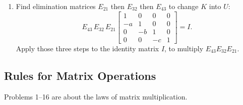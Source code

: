 \documentclass[14pt, a4paper]{article}
\begin{document}
\begin{enumerate}[resume]
    \item Find elimination matrices $E_{21}$ then $E_{32}$ then $E_{43}$ to change $K$ into $U$:
          \[
              E_{43}\,E_{32}\,E_{21}
              \begin{bmatrix}
                  1  & 0  & 0  & 0 \\
                  -a & 1  & 0  & 0 \\
                  0  & -b & 1  & 0 \\
                  0  & 0  & -c & 1
              \end{bmatrix}
              = I.
          \]
          Apply those three steps to the identity matrix $I$, to multiply $E_{43}E_{32}E_{21}$.
\end{enumerate}

\subsection{Rules for Matrix Operations}
\noindent Problems 1--16 are about the laws of matrix multiplication.
\end{document}

